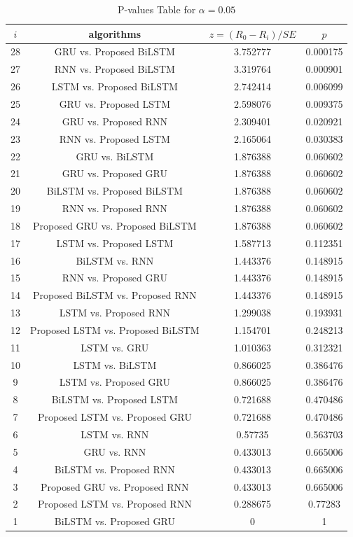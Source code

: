 \documentclass[sn-mathphys,Numbered]{sn-jnl}
\theoremstyle{thmstyleone}
\theoremstyle{thmstyletwo}
\theoremstyle{thmstylethree}
\begin{document}
\begin{table}[!htbp]
\centering\scriptsize
\begin{tabular}{cccc}
\hline
$i$&algorithms&$z=(R_0 - R_i)/SE$&$p$\\
\hline28&GRU vs. Proposed BiLSTM&3.752777&0.000175\\
27&RNN vs. Proposed BiLSTM&3.319764&0.000901\\
26&LSTM vs. Proposed BiLSTM&2.742414&0.006099\\
25&GRU vs. Proposed LSTM&2.598076&0.009375\\
24&GRU vs. Proposed RNN&2.309401&0.020921\\
23&RNN vs. Proposed LSTM&2.165064&0.030383\\
22&GRU vs. BiLSTM&1.876388&0.060602\\
21&GRU vs. Proposed GRU&1.876388&0.060602\\
20&BiLSTM vs. Proposed BiLSTM&1.876388&0.060602\\
19&RNN vs. Proposed RNN&1.876388&0.060602\\
18&Proposed GRU vs. Proposed BiLSTM&1.876388&0.060602\\
17&LSTM vs. Proposed LSTM&1.587713&0.112351\\
16&BiLSTM vs. RNN&1.443376&0.148915\\
15&RNN vs. Proposed GRU&1.443376&0.148915\\
14&Proposed BiLSTM vs. Proposed RNN&1.443376&0.148915\\
13&LSTM vs. Proposed RNN&1.299038&0.193931\\
12&Proposed LSTM vs. Proposed BiLSTM&1.154701&0.248213\\
11&LSTM vs. GRU&1.010363&0.312321\\
10&LSTM vs. BiLSTM&0.866025&0.386476\\
9&LSTM vs. Proposed GRU&0.866025&0.386476\\
8&BiLSTM vs. Proposed LSTM&0.721688&0.470486\\
7&Proposed LSTM vs. Proposed GRU&0.721688&0.470486\\
6&LSTM vs. RNN&0.57735&0.563703\\
5&GRU vs. RNN&0.433013&0.665006\\
4&BiLSTM vs. Proposed RNN&0.433013&0.665006\\
3&Proposed GRU vs. Proposed RNN&0.433013&0.665006\\
2&Proposed LSTM vs. Proposed RNN&0.288675&0.77283\\
1&BiLSTM vs. Proposed GRU&0&1\\
\hline
\end{tabular}
\caption{P-values Table for $\alpha=0.05$}
\label{tab:pvalue}
\end{table}
\pagebreak
\end{document}

